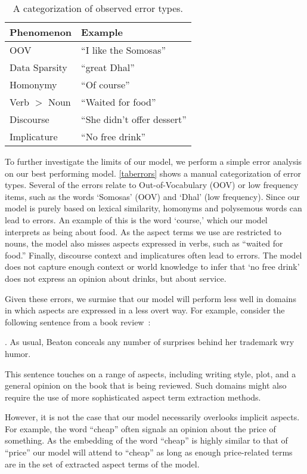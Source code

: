\documentclass[11pt,a4paper]{article}
\begin{document}
\begin{table}[t]
\begin{tabular}{ll}
\textbf{Phenomenon}  & \textbf{Example}         \\
\midrule
OOV         & ``I like the Somosas''  \\
Data Sparsity & ``great Dhal'' \\
Homonymy    & ``Of course''      \\
Verb $>$ Noun & ``Waited for food'' \\
Discourse   & ``She didn't offer dessert''  \\
Implicature & ``No free drink''
\end{tabular}
\caption{A categorization of observed error types.}
\label{taberrors}
\end{table}

To further investigate the limits of our model, we perform a simple error analysis on our best performing model.
\autoref{taberrors} shows a manual categorization
of error types.
Several of the errors relate to Out-of-Vocabulary (OOV) or low frequency items, such as the words `Somosas' (OOV) and `Dhal' (low frequency).
Since our model is purely based on lexical similarity, homonyms and polysemous words can lead to errors. 
An example of this is the word `course,'
which our model interprets as being about food.
As the aspect terms we use are restricted to nouns,
the model also misses aspects expressed in verbs, such as ``waited for food.''
Finally, discourse context and implicatures often lead to errors.
The model does not capture enough context or world knowledge to infer that `no free drink' does not express an opinion about drinks, but about service.

Given these errors, we surmise that our model will perform less well in domains in which aspects are expressed in a less overt way.
For example, consider the following sentence from a book review~\citep{kirkus2019review}:

\ex. As usual, Beaton conceals any number of surprises behind her trademark wry humor.

This sentence touches on a range of aspects, including writing style, plot, and a general opinion on the book that is being reviewed.
Such domains might also require the use of more sophisticated aspect term extraction methods.

However, it is not the case that our model necessarily overlooks implicit aspects. For example, the word ``cheap''  often signals an opinion about the price of something. 
As the embedding of the word ``cheap'' is highly similar to that of ``price'' our model will attend to ``cheap'' as long as enough price-related terms are in the set of extracted aspect terms of the model.
\end{document}
